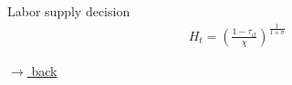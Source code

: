 \documentclass[11pt,aspectratio=169]{beamer}
\begin{document}
\begin{frame}{Labor supply decision}
\hypertarget{labsup}{}
\begin{align*}
	H_t=\left(\frac{1-\tau_{\iota t}}{\chi}\right)^{\frac{1}{1+\sigma}}
\end{align*}

\vfill
\vspace{0mm}
\hfill 
\hyperlink{hhopt}{\tiny{$\rightarrow$ back}}
\end{frame}





\end{document}
